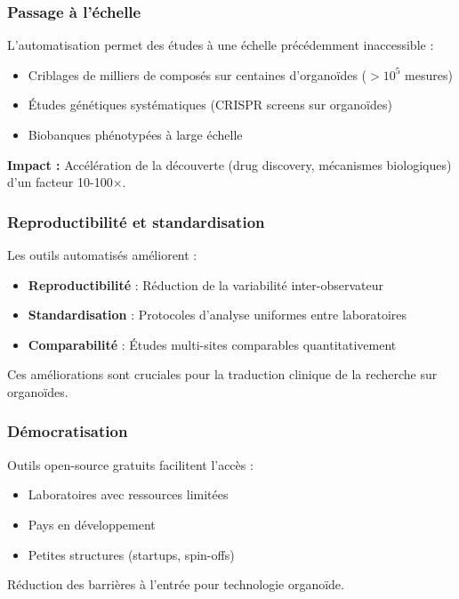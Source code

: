 \subsubsection{Passage à l'échelle}

L'automatisation permet des études à une échelle précédemment inaccessible :
\begin{itemize}
    \item Criblages de milliers de composés sur centaines d'organoïdes ($>10^5$ mesures)
    \item Études génétiques systématiques (CRISPR screens sur organoïdes)
    \item Biobanques phénotypées à large échelle
\end{itemize}

\textbf{Impact :}
Accélération de la découverte (drug discovery, mécanismes biologiques) d'un facteur 10-100×.

\subsubsection{Reproductibilité et standardisation}

Les outils automatisés améliorent :
\begin{itemize}
    \item \textbf{Reproductibilité} : Réduction de la variabilité inter-observateur
    \item \textbf{Standardisation} : Protocoles d'analyse uniformes entre laboratoires
    \item \textbf{Comparabilité} : Études multi-sites comparables quantitativement
\end{itemize}

Ces améliorations sont cruciales pour la traduction clinique de la recherche sur organoïdes.

\subsubsection{Démocratisation}

Outils open-source gratuits facilitent l'accès :
\begin{itemize}
    \item Laboratoires avec ressources limitées
    \item Pays en développement
    \item Petites structures (startups, spin-offs)
\end{itemize}

Réduction des barrières à l'entrée pour technologie organoïde.

